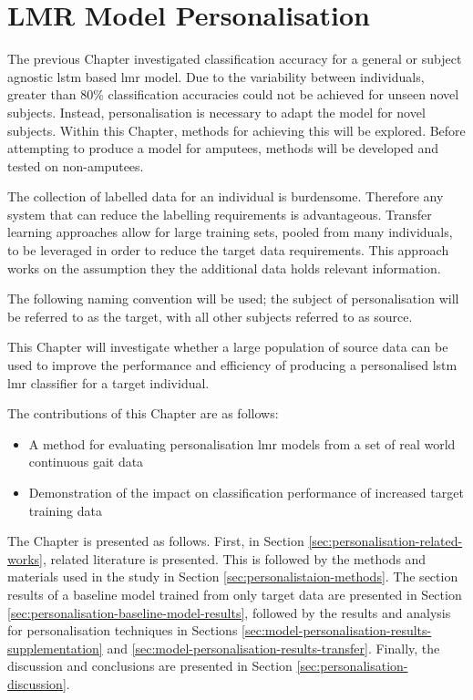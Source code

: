 \chapter{LMR Model Personalisation}
\label{chp:personalisation}
The previous Chapter investigated classification accuracy for a general or subject agnostic \acrshort{lstm} based \acrshort{lmr} model. Due to the variability between individuals, greater than 80\% classification accuracies could not be achieved for unseen novel subjects. Instead, personalisation is necessary to adapt the model for novel subjects. Within this Chapter, methods for achieving this will be explored. Before attempting to produce a model for amputees, methods will be developed and tested on non-amputees.

The collection of labelled data for an individual is burdensome. Therefore any system that can reduce the labelling requirements is advantageous. Transfer learning approaches allow for large training sets, pooled from many individuals, to be leveraged in order to reduce the target data requirements. This approach works on the assumption they the additional data holds relevant information.\cite{Fallahzadeh2017, Schneider2021}

The following naming convention will be used; the subject of personalisation will be referred to as the target, with all other subjects referred to as source.

This Chapter will investigate whether a large population of source data can be used to improve the performance and efficiency of producing a personalised \acrshort{lstm} \acrshort{lmr} classifier for a target individual.

The contributions of this Chapter are as follows:
\begin{itemize}
    \item A method for evaluating personalisation \acrshort{lmr} models from a set of real world continuous gait data
    \item Demonstration of the impact on classification performance of increased target training data
\end{itemize}

The Chapter is presented as follows. First, in Section \ref{sec:personalisation-related-works}, related literature is presented. This is followed by the methods and materials used in the study in Section \ref{sec:personalistaion-methods}. The section  results of a baseline model trained from only target data are presented in Section \ref{sec:personalisation-baseline-model-results}, followed by the results and analysis for personalisation techniques in Sections \ref{sec:model-personalisation-results-supplementation} and \ref{sec:model-personalisation-results-transfer}. Finally, the discussion and conclusions are presented in Section \ref{sec:personalisation-discussion}.

